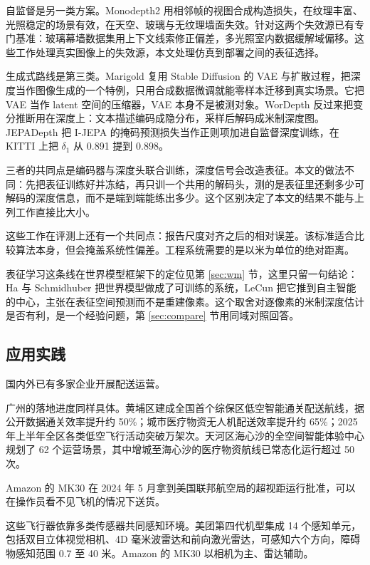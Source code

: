 \documentclass[12pt,a4paper]{ctexart}
\begin{document}
自监督是另一类方案。Monodepth2 用相邻帧的视图合成构造损失\cite{monodepth2}，在纹理丰富、光照稳定的场景有效，在天空、玻璃与无纹理墙面失效。针对这两个失效源已有专门基准：玻璃幕墙数据集用上下文线索修正偏差\cite{glasswall}，多光照室内数据缓解域偏移\cite{mil}。这些工作处理真实图像上的失效源，本文处理仿真到部署之间的表征选择。

生成式路线是第三类。Marigold 复用 Stable Diffusion 的 VAE 与扩散过程，把深度当作图像生成的一个特例，只用合成数据微调就能零样本迁移到真实场景\cite{marigold}。它把 VAE 当作 latent 空间的压缩器，VAE 本身不是被测对象。WorDepth 反过来把变分推断用在深度上：文本描述编码成隐分布，采样后解码成米制深度图\cite{wordepth}。JEPADepth 把 I-JEPA 的掩码预测损失当作正则项加进自监督深度训练，在 KITTI 上把 $\delta_1$ 从 0.891 提到 0.898\cite{jepadepth}。

三者的共同点是编码器与深度头联合训练，深度信号会改造表征。本文的做法不同：先把表征训练好并冻结，再只训一个共用的解码头，测的是表征里还剩多少可解码的深度信息，而不是端到端能练出多少。这个区别决定了本文的结果不能与上列工作直接比大小。

这些工作在评测上还有一个共同点：报告尺度对齐之后的相对误差。该标准适合比较算法本身，但会掩盖系统性偏差。工程系统需要的是以米为单位的绝对距离。

表征学习这条线在世界模型框架下的定位见第 \ref{sec:wm} 节，这里只留一句结论：Ha 与 Schmidhuber 把世界模型做成了可训练的系统，LeCun 把它推到自主智能的中心，主张在表征空间预测而不是重建像素。这个取舍对逐像素的米制深度估计是否有利，是一个经验问题，第 \ref{sec:compare} 节用同域对照回答。

\subsection{应用实践}

国内外已有多家企业开展配送运营。

广州的落地进度同样具体。黄埔区建成全国首个综保区低空智能通关配送航线，据公开数据通关效率提升约 50\%；城市医疗物资无人机配送效率提升约 65\%；2025 年上半年全区各类低空飞行活动突破万架次。天河区海心沙的全空间智能体验中心规划了 62 个运营场景，其中增城至海心沙的医疗物资航线已常态化运行超过 50 次。

Amazon 的 MK30 在 2024 年 5 月拿到美国联邦航空局的超视距运行批准，可以在操作员看不见飞机的情况下送货。

这些飞行器依靠多类传感器共同感知环境。美团第四代机型集成 14 个感知单元，包括双目立体视觉相机、4D 毫米波雷达和前向激光雷达，可感知六个方向，障碍物感知范围 0.7 至 40 米。Amazon 的 MK30 以相机为主、雷达辅助。
\end{document}
